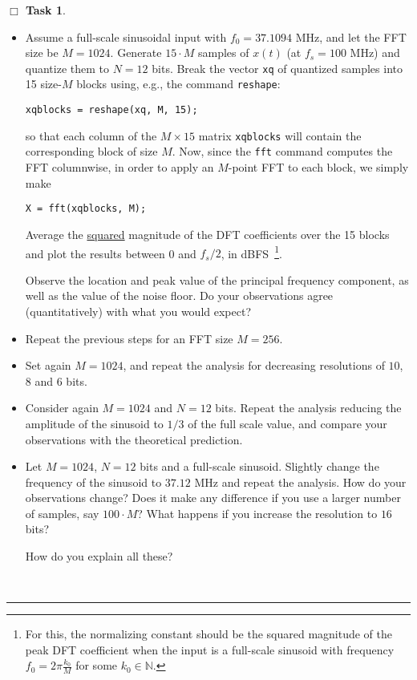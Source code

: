 \documentclass[11pt]{article}
\newcounter{ntask}
\newtheorem{task}[ntask]{$\Box$ Task}
\newenvironment{Task}
{\begin{task}\end{task} \vspace{-0.1in}\sf}
{\hfill \QED}
\def\QED{~\rule[-1pt]{5pt}{5pt}\par\medskip}
\begin{document}
\begin{Task}

\begin{itemize}

\item  Assume a full-scale sinusoidal input with $f_0 = 37.1094$ MHz, and let the FFT size be $M = 1024$.
Generate $15 \cdot M$ samples of $x(t)$ (at  $f_s=100$ MHz) and quantize them
to $N=12$ bits. Break the vector {\tt xq} of quantized samples into 15 size-$M$ blocks using, e.g., the command {\tt reshape}:
\begin{center}
{\tt xqblocks = reshape(xq, M, 15); }
\end{center}
so that each column of the $M \times 15$ matrix {\tt xqblocks} will contain the corresponding block of size $M$.
Now, since the {\tt fft} command computes the FFT columnwise, in order to apply an $M$-point FFT to each block, we simply make
\begin{center}
{\tt X = fft(xqblocks, M);}
\end{center}

Average the \underline{squared} magnitude of the DFT coefficients over the 15 blocks and plot the results between 0 and $f_s/2$, in dBFS~\footnote{For this, the normalizing constant should be the squared magnitude of the peak DFT coefficient when the input is a full-scale sinusoid with frequency $f_0 = 2\pi \frac{k_0}{M}$ for some $k_0 \in \mathbb{N}$.}.

 
Observe the location and peak value of the principal frequency component, as well as the value of the noise floor.
Do your observations agree (quantitatively) with what you would expect?

\item Repeat the previous steps for an FFT size $M=256$.

\item Set again $M=1024$, and repeat the analysis for decreasing resolutions of $10$, $8$ and $6$ bits. 

\item Consider again $M=1024$ and $N=12$ bits. Repeat the analysis reducing the amplitude of the sinusoid to $1/3$ of the full scale value, and compare your observations with the theoretical prediction.

\item Let $M=1024$, $N=12$ bits and a full-scale sinusoid. Slightly change the frequency of the sinusoid to $37.12$ MHz and repeat the analysis. How do your observations change?  Does it make any difference if you use a larger number of samples, say $100\cdot M$? What happens if you increase the resolution to $16$ bits? 

How do you explain all these?

\end{itemize}
\vspace*{-0.5cm}
\end{Task}
\end{document}
